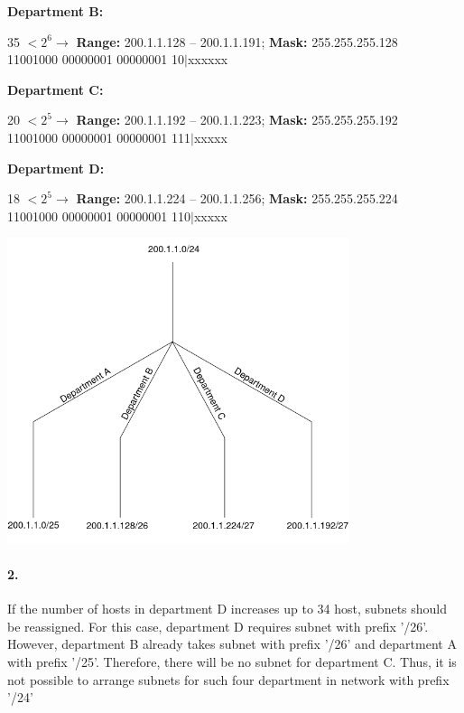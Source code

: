 \documentclass[11pt]{article}
\begin{document}
    \textbf{Department B:}
    \begin{center}
        35 $< 2^6 \longrightarrow$ \textbf{Range:} 200.1.1.128 -- 200.1.1.191; \textbf{Mask:} 255.255.255.128 \\
        11001000 00000001 00000001 10$\mid$xxxxxx \\
    \end{center}

    \textbf{Department C:}
    \begin{center}
        20 $< 2^5 \longrightarrow$ \textbf{Range:} 200.1.1.192 -- 200.1.1.223; \textbf{Mask:} 255.255.255.192 \\
        11001000 00000001 00000001 111$\mid$xxxxx\\
    \end{center}

    \textbf{Department D:}
    \begin{center}
        18 $< 2^5 \longrightarrow$ \textbf{Range:} 200.1.1.224 -- 200.1.1.256; \textbf{Mask:} 255.255.255.224 \\
        11001000 00000001 00000001 110$\mid$xxxxx \\
    \end{center}

    \begin{center}
        \includegraphics[width=0.75\textwidth]{figs/Sol6-1}
    \end{center}

    \paragraph{2.}
    If the number of hosts in department D increases up to 34 host, subnets should be reassigned.
    For this case, department D requires subnet with prefix '/26'.
    However, department B already takes subnet with prefix '/26' and department A with prefix '/25'.
    Therefore, there will be no subnet for department C.
    Thus, it is not possible to arrange subnets for such four department in network with prefix '/24'
\end{document}
